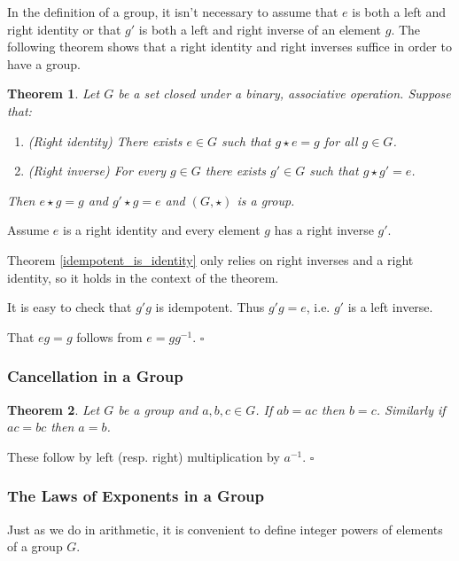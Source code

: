 \documentclass[10pt]{article}
\newtheorem{theorem}{Theorem}[section]
\newenvironment{proof}[1][Proof]{\begin{trivlist}
\item[\hskip \labelsep {\itshape #1}]}{\end{trivlist}}
\begin{document}
In the definition of a group, it isn't necessary to assume that $e$ is both a left and right identity or that $g'$ is both a left and right inverse of an element $g$. The following theorem shows that a right identity and right inverses suffice in order to have a group.

\begin{theorem}
Let $G$ be a set closed under a binary, associative operation. Suppose that:
\begin{enumerate}
\item (Right identity) There exists $e \in G$ such that $g\star e = g$ for all $g \in G$.
\item (Right inverse) For every $g \in G$ there exists $g' \in G$ such that $g\star g' = e$.
\end{enumerate}
Then $e\star g = g$ and $g'\star g = e$ and $(G, \star)$ is a group.
\end{theorem}

\begin{proof}
Assume $e$ is a right identity and every element $g$ has a right inverse $g'$.

Theorem \ref{idempotent_is_identity} only relies on right inverses and a right identity, so it holds in the context of the theorem.

It is easy to check that $g'g$ is idempotent. Thus $g'g = e$, i.e. $g'$ is a left inverse.

That $eg = g$ follows from $e = gg^{-1}$. $\square$
\end{proof}

\subsubsection{Cancellation in a Group}

\begin{theorem}
Let $G$ be a group and $a, b, c \in G$. If $ab = ac$ then $b = c$. Similarly if $ac = bc$ then $a = b$.
\end{theorem}

\begin{proof}
These follow by left (resp. right) multiplication by $a^{-1}$. $\square$
\end{proof}

\subsubsection{The Laws of Exponents in a Group}

Just as we do in arithmetic, it is convenient to define integer powers of elements of a group $G$.
\end{document}
